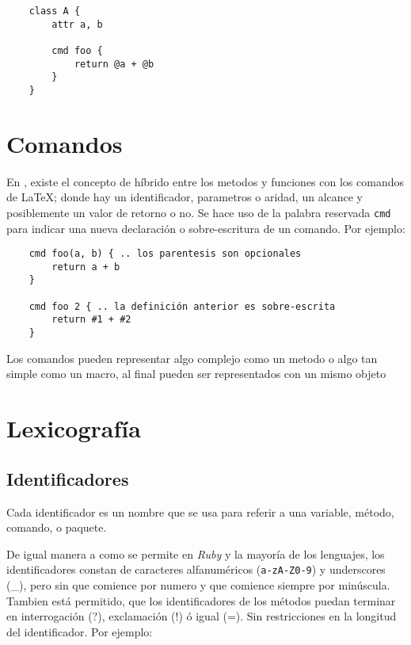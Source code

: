 \documentclass[12pt,letterpaper,titlepage,oneside,openright]{book}
\newcommand{\OhTeX}{%
    \makebox[0.76em][c]{O}%
    \makebox[0.25em][c]{%
        \raisebox{0.14em}[0em][0em]{%
            \fontsize{0.5em}{0cm}%
                \selectfont H%
        }%
    }%
    \makebox[1.35em][c]{\TeX}%
}
\newcommand{\latex}{\LaTeX\xspace}
\newcommand{\ohtex}{\OhTeX\xspace}
\newcommand{\ruby}{\textit{Ruby}\xspace}
\begin{document}
\begin{center}
\begin{lstlisting}
    class A {
        attr a, b

        cmd foo {
            return @a + @b
        }
    }
\end{lstlisting}
\end{center}

\section{Comandos}

En \ohtex, existe el concepto de híbrido entre los metodos y funciones con los comandos de \latex; donde hay un identificador, parametros o aridad, un alcance y posiblemente un valor de retorno o no. Se hace uso de la palabra reservada \texttt{cmd} para indicar una nueva declaración o sobre-escritura de un comando. Por ejemplo:

\newpage

\begin{center}
\begin{lstlisting}
    cmd foo(a, b) { .. los parentesis son opcionales
        return a + b
    }

    cmd foo 2 { .. la definición anterior es sobre-escrita
        return #1 + #2
    }
\end{lstlisting}
\end{center}

Los comandos pueden representar algo complejo como un metodo o algo tan simple como un macro, al final pueden ser representados con un mismo objeto

\section{Lexicografía}

\subsection{Identificadores}

Cada identificador es un nombre que se usa para referir a una variable, método,
comando, o paquete. 

De igual manera a como se permite en \ruby y la mayoría de los lenguajes, los
identificadores constan de caracteres alfanuméricos (\verb|a-zA-Z0-9|) y
underscores (\_), pero sin que comience por numero y que comience siempre por
minúscula. Tambien está permitido, que los identificadores de los métodos puedan
terminar en interrogación (?), exclamación (!) ó igual (=). Sin restricciones
en la longitud del identificador. Por ejemplo:
\end{document}
